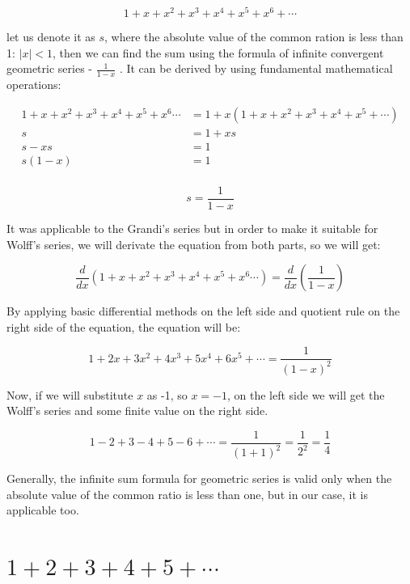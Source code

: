 \documentclass[a4paper]{article}
\begin{document}
\begin{equation*}
1+x+x^2+x^3+x^4+x^5+x^6+\cdots
\end{equation*}

let us denote it as \(s\),
where the absolute value of the common ration is less than 1: \(|x| < 1\), then we
can find the sum using the formula of infinite convergent geometric series -
\(\frac{1}{1-x}\) . It can be derived by using fundamental mathematical
operations: 

\begin{align*}
  1+x+x^2+x^3+x^4+x^5+x^6\cdots&=1+x(1+x+x^2+x^3+x^4+x^5+\cdots)\\
  s&=1+xs\\
  s-xs&=1\\
  s(1-x)&=1\\
\end{align*}

\begin{equation}
  s=\frac{1}{1-x}
  \end{equation}

It was applicable to the Grandi's series but in order to make it suitable for
Wolff's series, we will derivate the equation from both parts, so we will get: 

\begin{equation*}
  \frac{d}{dx}(1+x+x^2+x^3+x^4+x^5+x^6\cdots)=\frac{d}{dx}(\frac{1}{1-x})
  \end{equation*}

By applying basic differential methods on the left side and quotient rule on the
right side of the equation, the equation will be:

\begin{equation*}
  1+2x+3x^2+4x^3+5x^4+6x^5+\cdots=\frac{1}{(1-x)^2}
  \end{equation*}

Now, if we will substitute \(x\) as -1, so \(x=-1\), on the left side we will get
the Wolff's series and some finite value on the right side.

\begin{equation}
  1-2+3-4+5-6+\cdots=\frac{1}{(1+1)^2}=\frac{1}{2^2}=\frac{1}{4}
  \label{Wolff}
\end{equation}

Generally, the infinite sum formula for geometric series is valid only when the
absolute value of the common ratio is less than one, but in our case, it is
applicable too. 

\section{\(1+2+3+4+5+\cdots\)}
\label{sec:org720e4c7}
\end{document}
